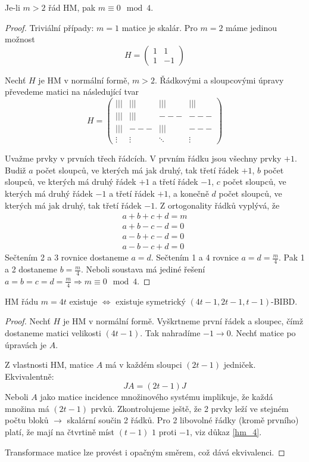 \begin{theorem}\label{hm_4}
    Je-li $m>2$ řád HM, pak $m\equiv 0\mod 4$.
\end{theorem}
\begin{proof}
	Triviální případy: $m = 1$ matice je skalár.
	Pro $m = 2$ máme jedinou možnost
	\[ H = \begin{pmatrix} 1 & 1\\ 1 & -1 \end{pmatrix} \]

	Nechť $H$ je HM v normální formě, $m > 2$.
	Řádkovými a sloupcovými úpravy převedeme matici na následující tvar
	\[ H = \begin{pmatrix}
		||| & ||| & ||| & ||| \\
		||| & ||| & --- & --- \\
		||| & --- & ||| & --- \\
            	\vdots  & \vdots  & \ddots & \vdots
	      \end{pmatrix}
	\]

	Uvažme prvky v prvních třech řádcích. V prvním řádku jsou všechny prvky $+1$.
	Budiž $a$ počet sloupců, ve kterých má jak druhý, tak třetí řádek $+1$, $b$ počet sloupců, ve kterých má druhý řádek $+1$ a třetí řádek $-1$, $c$
	počet sloupců, ve kterých má druhý řádek $-1$ a třetí řádek $+1$, a konečně $d$ počet sloupců, ve kterých má jak druhý, tak třetí řádek $-1$.
	Z ortogonality řádků vyplývá, že
	\begin{gather*}
		a + b + c + d = m\\
		a + b - c - d = 0\\
		a - b + c - d = 0\\
		a - b - c + d = 0
	\end{gather*}
	Sečtením 2 a 3 rovnice dostaneme $a = d$.
	Sečtením 1 a 4 rovnice $a = d = \frac{m}{4}$.
	Pak 1 a 2 dostaneme $b = \frac{m}{4}$.
	Neboli soustava má jediné řešení $a = b = c = d = \frac{m}{4} \Rightarrow m \equiv 0 \mod4$.
\end{proof}

\begin{theorem}
    HM řádu $m=4t$ existuje $\iff$ existuje symetrický $(4t-1,2t-1,t-1)$-BIBD.
\end{theorem}
\begin{proof}
	Nechť $H$ je HM v normální formě.
	Vyškrtneme první řádek a sloupec, čímž dostaneme matici velikosti $(4t - 1)$.
	Tak nahradíme $-1 \to 0$.
	Nechť matice po úpravách je $A$.

	Z vlastnosti HM, matice $A$ má v každém sloupci $(2t - 1)$ jedniček.
	Ekvivalentně:
	\[ JA = (2t - 1) J \]
	Neboli $A$ jako matice incidence množinového systému implikuje, že každá množina má $(2t - 1)$ prvků.
	Zkontrolujeme ještě, že 2 prvky leží ve stejném počtu bloků $\to$ skalární součin 2 řádků.
	Pro 2 libovolné řádky (kromě prvního) platí, že mají na čtvrtině míst $(t - 1)$ $1$ proti $-1$, viz důkaz \cref{hm_4}.

	Transformace matice lze provést i opačným směrem, což dává ekvivalenci.
\end{proof}

